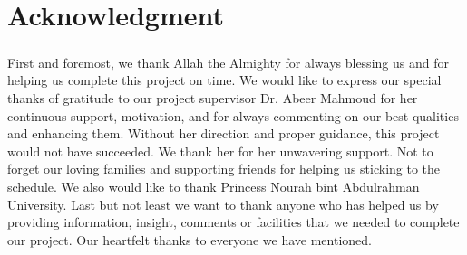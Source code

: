 \documentclass[12pt, oneside, a4paper]{book}
\begin{document}
	\chapter*{Acknowledgment}
	\label{sec:ack}
	\paragraph{} First and foremost, we thank Allah the Almighty for always blessing us and for helping us complete this project on time. We would like to express our special thanks of gratitude to our project supervisor Dr. Abeer Mahmoud for her continuous support, motivation, and for always commenting on our best qualities and enhancing them. Without her direction and proper guidance, this project would not have succeeded. We thank her for her unwavering support. Not to forget our loving families and supporting friends for helping us sticking to the schedule. We also would like to thank Princess Nourah bint Abdulrahman University. Last but not least we want to thank anyone who has helped us by providing information, insight, comments or facilities that we needed to complete our project. Our heartfelt thanks to everyone we have mentioned.




	\tableofcontents
	\newpage	
	\doublespacing
	\newpage
	
	\listoftables
	\newpage
	
	\listoffigures
	\newpage
	
\end{document}

